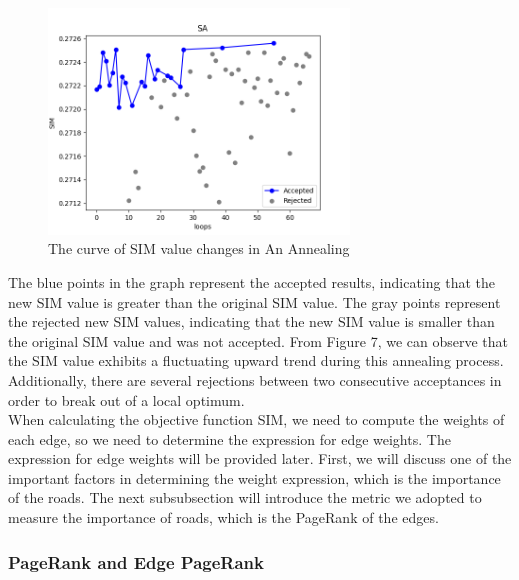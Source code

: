 \begin{figure}[H]%
    \centering
    \includegraphics[width=8cm,height=6cm]{SA1-1.png}
    \caption{The curve of SIM value changes in An Annealing}
\end{figure}
\indent The blue points in the graph represent the accepted results, indicating that the new SIM value is greater than the original SIM value. The gray points represent the rejected new SIM values, indicating that the new SIM value is smaller than the original SIM value and was not accepted. From Figure 7, we can observe that the SIM value exhibits a fluctuating upward trend during this annealing process. Additionally, there are several rejections between two consecutive acceptances in order to break out of a local optimum.\\
\indent When calculating the objective function SIM, we need to compute the weights of each edge, so we need to determine the expression for edge weights. The expression for edge weights will be provided later. First, we will discuss one of the important factors in determining the weight expression, which is the importance of the roads. The next subsubsection will introduce the metric we adopted to measure the importance of roads, which is the PageRank of the edges.

\subsubsection{PageRank and Edge PageRank}

